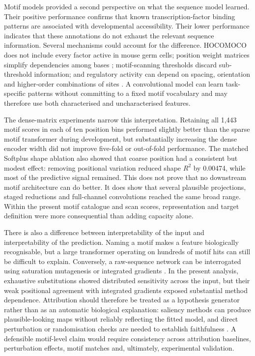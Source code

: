 \documentclass[a4paper,12pt]{article}
\begin{document}
Motif models provided a second perspective on what the sequence model learned. Their positive performance confirms that known transcription-factor binding patterns are associated with developmental accessibility. Their lower performance indicates that these annotations do not exhaust the relevant sequence information. Several mechanisms could account for the difference. HOCOMOCO does not include every factor active in mouse germ cells; position weight matrices simplify dependencies among bases \citep{yang2015dnashape}; motif-scanning thresholds discard sub-threshold information; and regulatory activity can depend on spacing, orientation and higher-order combinations of sites \citep{jolma2015tfpairs,avsec2021bpnet}. A convolutional model can learn task-specific patterns without committing to a fixed motif vocabulary and may therefore use both characterised and uncharacterised features.

The dense-matrix experiments narrow this interpretation. Retaining all 1,443 motif scores in each of ten position bins performed slightly better than the sparse motif transformer during development, but substantially increasing the dense encoder width did not improve five-fold or out-of-fold performance. The matched Softplus shape ablation also showed that coarse position had a consistent but modest effect: removing positional variation reduced shape $R^2$ by 0.00474, while most of the predictive signal remained. This does not prove that no downstream motif architecture can do better. It does show that several plausible projections, staged reductions and full-channel convolutions reached the same broad range. Within the present motif catalogue and scan scores, representation and target definition were more consequential than adding capacity alone.

There is also a difference between interpretability of the input and interpretability of the prediction. Naming a motif makes a feature biologically recognisable, but a large transformer operating on hundreds of motif hits can still be difficult to explain. Conversely, a raw-sequence network can be interrogated using saturation mutagenesis or integrated gradients \citep{sundararajan2017ig}. In the present analysis, exhaustive substitutions showed distributed sensitivity across the input, but their weak positional agreement with integrated gradients exposed substantial method dependence. Attribution should therefore be treated as a hypothesis generator rather than as an automatic biological explanation: saliency methods can produce plausible-looking maps without reliably reflecting the fitted model, and direct perturbation or randomisation checks are needed to establish faithfulness \citep{adebayo2018sanity}. A defensible motif-level claim would require consistency across attribution baselines, perturbation effects, motif matches and, ultimately, experimental validation.
\end{document}
